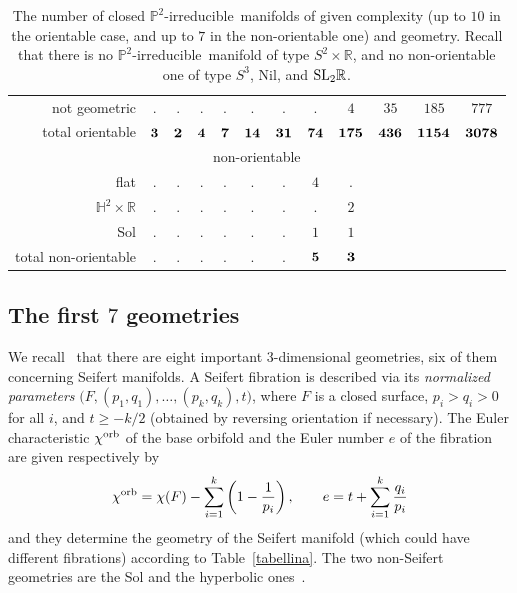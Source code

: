 \documentclass[10pt]{article}      %
\newcommand{\matR} {\ensuremath {\mathbb{R}}}
\newcommand{\matH} {\ensuremath {\mathbb{H}}}
\newcommand{\matP} {\ensuremath {\mathbb{P}}}
\newcommand{\Sol}{{\rm Sol}}
\newcommand{\ptwoirred}{$\matP^2$-irreducible}
\begin{document}
\begin{table}
\begin{center}
\begin{tabular}{rccccccccccc}
      not geometric &
      . & . & . & . & . & . & .   & $4$  & $35$  & $185$ & $777$\\
      
      total orientable  &
      $\bf{3}$ & $\bf{2}$ & $\bf{4}$ & $\bf{7}$ & $\bf{14}$ & $\bf{31}$ & $\bf{74}$ & $\bf{175}$ & $\bf{436}$ & $\bf{1154}$ & $\bf{3078}$ \\

      \multicolumn{12}{c}{non-orientable\phantom{\Big|}} \\

      flat &
      . & . & . & . & . & . & $4$     & .   & & & \\

      $\matH^2\times\matR$ &
      . & . & . & . & . & . & .       & $2$ & & & \\

      \Sol &
      . & . & . & . & . & . & $1$     & $1$ & & & \\

      total non-orientable &
      . & . & . & . & . & . & $\bf 5$ & $\bf 3$ & & & \\

    \end{tabular}
  \end{center} 
  \caption{The number of closed \ptwoirred\ manifolds of
    given complexity (up to $10$ in the orientable case, 
and up to $7$ in the non-orientable
one) and geometry. Recall that there is no \ptwoirred\ manifold of type $S^2\times\matR$, and
no non-orientable one of type $S^3$,  Nil, and ${\rm SL}_2\matR$.
}
  \label{closed:table}
\end{table}



\subsection{The first $7$ geometries}
We recall~\cite{Sco} that there are eight important 3-dimensional geometries, six of them 
concerning Seifert manifolds. 
A Seifert fibration is described via its \emph{normalized parameters}
$\big(F, (p_1, q_1), \ldots, (p_k, q_k), t\big)$, where $F$ is a closed surface, 
$p_i>q_i>0$ for all $i$, and $t\geqslant -k/2$
(obtained by reversing orientation if necessary).
The Euler characteristic $\chi^{\rm orb}$ of the base orbifold and the Euler number
$e$ of the fibration are given respectively by
$$\chi^{\rm orb} = \chi(F)-\sum_{i=1}^k \left(1-\frac 1{p_i}\right), 
\qquad e = t + \sum_{i=1}^k \frac{q_i}{p_i}$$
and they determine the geometry of the Seifert manifold (which could have different
fibrations) according to Table~\ref{tabellina}. The two non-Seifert
geometries are the Sol and the hyperbolic ones~\cite{Sco}.
\end{document}
